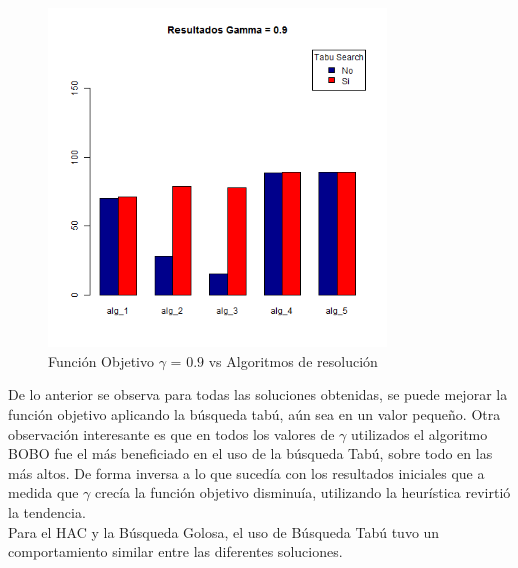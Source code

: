 \begin{figure}[H]
  \centering
    \includegraphics[width=0.8\textwidth]{resultados/papers/Graficos_agrupados/gamma09.png}
  \caption{Función Objetivo $\gamma$ = $0.9$ vs Algoritmos de resolución}
  \label{res:img-papers-agr-gamma09}
\end{figure}

De lo anterior se observa para todas las soluciones obtenidas, se puede mejorar la función objetivo aplicando la búsqueda tabú, aún sea en un valor pequeño. Otra observación interesante es que en todos los valores de $\gamma$ utilizados el algoritmo BOBO fue el más beneficiado en el uso de la búsqueda Tabú, sobre todo en las más altos. De forma inversa a lo que sucedía con los resultados iniciales que a medida que $\gamma$ crecía la función objetivo disminuía, utilizando la heurística revirtió la tendencia.\\
Para el HAC y la Búsqueda Golosa, el uso de Búsqueda Tabú tuvo un comportamiento similar entre las diferentes soluciones.\\

